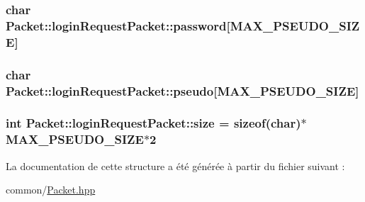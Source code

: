 \subsubsection[{password}]{\setlength{\rightskip}{0pt plus 5cm}char Packet\+::login\+Request\+Packet\+::password\mbox{[}{\bf M\+A\+X\+\_\+\+P\+S\+E\+U\+D\+O\+\_\+\+S\+I\+Z\+E}\mbox{]}}\label{structPacket_1_1loginRequestPacket_a85c2b868828d558ac942eadfc8c29523}
\hypertarget{structPacket_1_1loginRequestPacket_aaa36718e5f1c5d8ac6c13e6065502268}{}
\subsubsection[{pseudo}]{\setlength{\rightskip}{0pt plus 5cm}char Packet\+::login\+Request\+Packet\+::pseudo\mbox{[}{\bf M\+A\+X\+\_\+\+P\+S\+E\+U\+D\+O\+\_\+\+S\+I\+Z\+E}\mbox{]}}\label{structPacket_1_1loginRequestPacket_aaa36718e5f1c5d8ac6c13e6065502268}
\hypertarget{structPacket_1_1loginRequestPacket_ae39055594bd945531dae9e02448dc084}{}
\subsubsection[{size}]{\setlength{\rightskip}{0pt plus 5cm}int Packet\+::login\+Request\+Packet\+::size = sizeof(char)$\ast${\bf M\+A\+X\+\_\+\+P\+S\+E\+U\+D\+O\+\_\+\+S\+I\+Z\+E}$\ast$2}\label{structPacket_1_1loginRequestPacket_ae39055594bd945531dae9e02448dc084}


La documentation de cette structure a été générée à partir du fichier suivant \+:\begin{DoxyCompactItemize}
\item 
common/\hyperlink{Packet_8hpp}{Packet.\+hpp}\end{DoxyCompactItemize}
